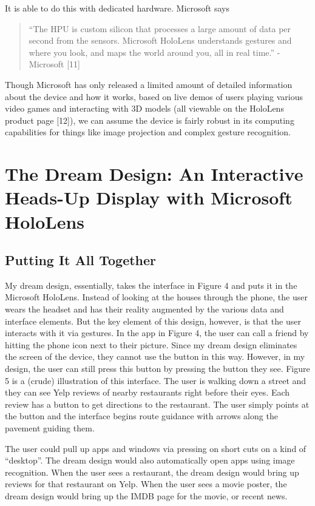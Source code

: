 \documentclass[a4paper,12pt]{article}
\begin{document}
It is able to do this with dedicated hardware. Microsoft says

\begin{quote}
    ``The HPU is custom silicon that processes a large amount of data per second from the sensors. Microsoft HoloLens understands gestures and where you look, and maps the world around you, all in real time.'' - Microsoft [11]
\end{quote}

Though Microsoft has only released a limited amount of detailed information about the device and how it works, based on live demos of users playing various video games and interacting with 3D models (all viewable on the HoloLens product page [12]), we can assume the device is fairly robust in its computing capabilities for things like image projection and complex gesture recognition. 

\section{The Dream Design: An Interactive Heads-Up Display with Microsoft HoloLens}

\subsection{Putting It All Together}

My dream design, essentially, takes the interface in Figure 4 and puts it in the Microsoft HoloLens. Instead of looking at the houses through the phone, the user wears the headset and has their reality augmented by the various data and interface elements. But the key element of this design, however, is that the user interacts with it via gestures. In the app in Figure 4, the user can call a friend by hitting the phone icon next to their picture. Since my dream design eliminates the screen of the device, they cannot use the button in this way. However, in my design, the user can still press this button by pressing the button they see. Figure 5 is a (crude) illustration of this interface. The user is walking down a street and they can see Yelp reviews of nearby restaurants right before their eyes. Each review has a button to get directions to the restaurant. The user simply points at the button and the interface begins route guidance with arrows along the pavement guiding them.

The user could pull up apps and windows via pressing on short cuts on a kind of ``desktop''. The dream design would also automatically open apps using image recognition. When the user sees a restaurant, the dream design would bring up reviews for that restaurant on Yelp. When the user sees a movie poster, the dream design would bring up the IMDB page for the movie, or recent news.
\end{document}
